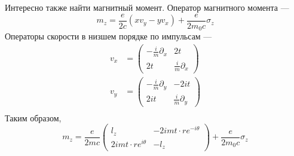 \documentclass{article}
\begin{document}
Интересно также найти магнитный момент. Оператор магнитного момента ---
\begin{equation}
    m_z = \frac{e}{2c}(x v_y - y v_x) + \frac{e}{2m_0c} \sigma_z
\end{equation}
Операторы скорости в низшем порядке по импульсам ---
\begin{equation}
    \begin{split}
        v_x & = \begin{pmatrix} 
                -\frac{i}{m} \partial_ x & 2t \\
                2t & \frac{i}{m}\partial_x
              \end{pmatrix} \\
        v_y & = \begin{pmatrix} 
                -\frac{i}{m} \partial_y & -2it \\
                2it & \frac{i}{m}\partial_y
              \end{pmatrix} \\
    \end{split}
\end{equation}
Таким образом,
\begin{equation}
    m_z = \frac{e}{2mc}
            \begin{pmatrix}
               l_z & -2imt\cdot re^{-i\theta} \\
               2imt\cdot r e^{i\theta} & -l_z
            \end{pmatrix} + 
          \frac{e}{2m_0c} \sigma_z
\end{equation}
\end{document}
